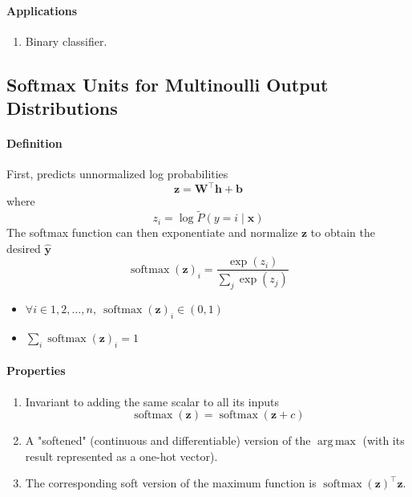 \documentclass[12pt, a4paper]{article}
\def\vb{\boldsymbol{b}}
\def\vh{\boldsymbol{h}}
\def\vx{\boldsymbol{x}}
\def\vy{\boldsymbol{y}}
\def\vz{\boldsymbol{z}}
\def\vW{\boldsymbol{W}}
\DeclareMathOperator*{\argmax}{arg\,max}
\DeclareMathOperator*{\softmax}{softmax}
\begin{document}
\paragraph{Applications}
\begin{enumerate}
    \item Binary classifier.
\end{enumerate}


\subsection{Softmax Units for Multinoulli Output Distributions}
\paragraph{Definition}
First, predicts unnormalized log probabilities
\[
    \vz = \vW^\top\vh + \vb
\]
where
\[
    z_i = \log \tilde{P}(y=i \mid \vx)
\]
The softmax function can then exponentiate and normalize $\vz$ to obtain the desired $\hat{\vy}$
\[
    \softmax(\vz)_i = \frac{\exp(z_i)}{\sum_j \exp(z_j)}
\]
\begin{itemize}
    \item $\forall i \in 1, 2, \dots, n,\ \softmax(\vz)_i \in (0, 1)$
    \item $\displaystyle \sum_i \softmax(\vz)_i = 1$
\end{itemize}
\paragraph{Properties}
\begin{enumerate}
    \item Invariant to adding the same scalar to all its inputs
        \[
            \softmax(\vz) = \softmax(\vz + c)
        \]
    \item A "softened" (continuous and differentiable) version of the $\argmax$ (with its result represented as a one-hot vector).
    \item The corresponding soft version of the maximum function is $\softmax(\vz)^\top \vz$.
\end{enumerate}
\end{document}
